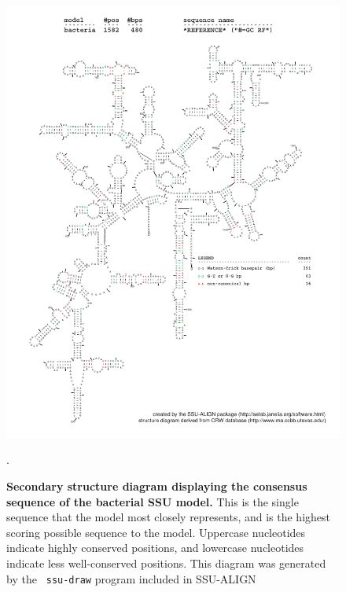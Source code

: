 \begin{figure}
\begin{center}
\includegraphics[width=5.7in]{Figures/bacteria-0p1-rf}
\end{center}
\caption[Secondary structure diagram displaying the consensus sequence
  of the bacterial SSU model]{\textbf{Secondary structure diagram displaying the
  consensus sequence of the bacterial SSU model.} 
  This is the single sequence that the model 
  most closely represents, and is the highest scoring possible
  sequence to the model. Uppercase nucleotides indicate highly conserved positions,
  and lowercase nucleotides indicate less well-conserved positions.
  This diagram was generated by the {\tt
  ssu-draw} program included in SSU-ALIGN}.
\label{fig:bacrf}
\end{figure}

\newpage 

